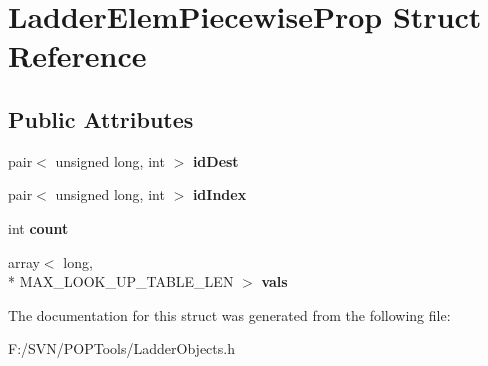 \hypertarget{struct_ladder_elem_piecewise_prop}{\section{Ladder\-Elem\-Piecewise\-Prop Struct Reference}
\label{struct_ladder_elem_piecewise_prop}
}
\subsection*{Public Attributes}
\begin{DoxyCompactItemize}
\item 
\hypertarget{struct_ladder_elem_piecewise_prop_aaf8f704fac83cda77b832566cd077b07}{pair$<$ unsigned long, int $>$ {\bfseries id\-Dest}}\label{struct_ladder_elem_piecewise_prop_aaf8f704fac83cda77b832566cd077b07}

\item 
\hypertarget{struct_ladder_elem_piecewise_prop_a801ed3129b011fd115a77b99efc905e3}{pair$<$ unsigned long, int $>$ {\bfseries id\-Index}}\label{struct_ladder_elem_piecewise_prop_a801ed3129b011fd115a77b99efc905e3}

\item 
\hypertarget{struct_ladder_elem_piecewise_prop_a26a10bcedafa2ea5c56177d6fa15c6e3}{int {\bfseries count}}\label{struct_ladder_elem_piecewise_prop_a26a10bcedafa2ea5c56177d6fa15c6e3}

\item 
\hypertarget{struct_ladder_elem_piecewise_prop_ad693dbe808f39e3db8c621115e9bf7bd}{array$<$ long, \\*
M\-A\-X\-\_\-\-L\-O\-O\-K\-\_\-\-U\-P\-\_\-\-T\-A\-B\-L\-E\-\_\-\-L\-E\-N $>$ {\bfseries vals}}\label{struct_ladder_elem_piecewise_prop_ad693dbe808f39e3db8c621115e9bf7bd}

\end{DoxyCompactItemize}


The documentation for this struct was generated from the following file\-:\begin{DoxyCompactItemize}
\item 
F\-:/\-S\-V\-N/\-P\-O\-P\-Tools/Ladder\-Objects.\-h\end{DoxyCompactItemize}

